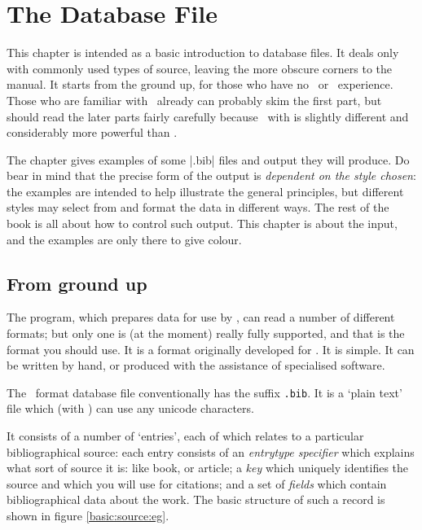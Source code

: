 \chapter{The Database File}\label{ch:database}

This chapter is intended as a basic introduction to database files. It
deals only with commonly used types of source, leaving the more
obscure corners to the manual. It starts from the ground up, for those
who have no \bibtex\ or \biblatex\ experience. Those who are familiar
with \bibtex\ already can probably skim the first part, but should
read the later parts fairly carefully because \biblatex\, with
 is slightly different and considerably more powerful
than \bibtex.

The chapter gives examples of some |.bib| files and output they will
produce. Do bear in mind that the precise form of the output is
\emph{dependent on the style chosen}: the examples are intended to
help illustrate the general principles, but different styles may
select from and format the data in different ways. The rest of the
book is all about how to control such output. This chapter is about
the input, and the examples are only there to give colour.

\section{From ground up}

The  program, which prepares data for use by \biblatex,
can read a number of different formats; but only one is (at the
moment) really fully supported, and that is the format you should
use. It is a format originally developed for \bibtex. It is simple. It
can be written by hand, or produced with the assistance of specialised
software.

The \bibtex\ format database file conventionally has the suffix
\verb|.bib|. It is a `plain text' file which (with )
can use any unicode characters.

It consists of a number of `entries', each of which relates to a
particular bibliographical source: each entry consists of an
\emph{entrytype specifier} which explains what sort of source it is:
like book, or article; a \emph{key} which uniquely identifies the
source and which you will use for citations; and a set of
\emph{fields} which contain bibliographical data about the work. The
basic structure of such a record is shown in figure
\ref{basic:source:eg}.

